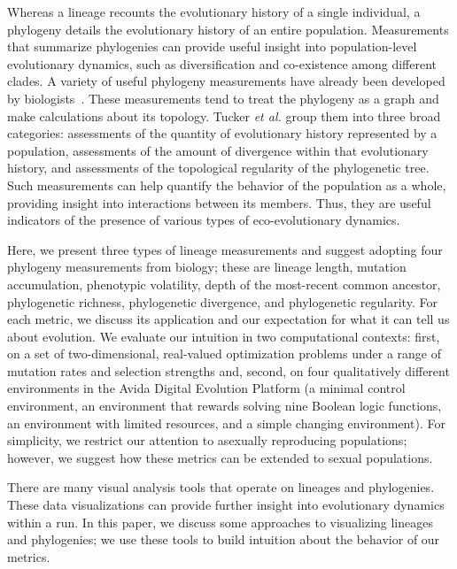 \documentclass[letterpaper]{article}
\begin{document}
Whereas a lineage recounts the evolutionary history of a single individual, a phylogeny details the evolutionary history of an entire population. Measurements that summarize phylogenies can provide useful insight into population-level evolutionary dynamics, such as diversification and co-existence among different clades. A variety of useful phylogeny measurements have already been developed by biologists~\citep{tucker_guide_2017}. These measurements tend to treat the phylogeny as a graph and make calculations about its topology. Tucker \textit{et al.} group them into three broad categories: assessments of the quantity of evolutionary history represented by a population, assessments of the amount of divergence within that evolutionary history, and assessments of the topological regularity of the phylogenetic tree. Such measurements can help quantify the behavior of the population as a whole, providing insight into interactions between its members. Thus, they are useful indicators of the presence of various types of eco-evolutionary dynamics.

Here, we present three types of lineage measurements and suggest adopting four phylogeny measurements from biology; these are lineage length, mutation accumulation, phenotypic volatility, depth of the most-recent common ancestor, phylogenetic richness, phylogenetic divergence, and phylogenetic regularity. For each metric, we discuss its application and our expectation for what it can tell us about evolution. We evaluate our intuition in two computational contexts: first, on a set of two-dimensional, real-valued optimization problems under a range of mutation rates and selection strengths and, second, on four qualitatively different environments in the Avida Digital Evolution Platform (a minimal control environment, an environment that rewards solving nine Boolean logic functions, an environment with limited resources, and a simple changing environment). For simplicity, we restrict our attention to asexually reproducing populations; however, we suggest how these metrics can be extended to sexual populations. 

There are many visual analysis tools that operate on lineages and phylogenies. These data visualizations can provide further insight into evolutionary dynamics within a run. In this paper, we discuss some approaches to visualizing lineages and phylogenies; we use these tools to build intuition about the behavior of our metrics.
\end{document}
